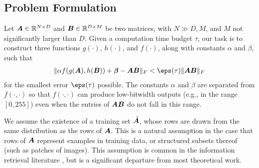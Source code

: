 \subsection{Problem Formulation} \label{sec:problemStatement}

Let $\bm{A} \in \mathbb{R}^{N \times D}$ and $\bm{B} \in \mathbb{R}^{D \times M}$ be two matrices, with $N \gg D, M$, and $M$ not significantly larger than $D$. Given a computation time budget $\tau$, our task is to
construct three functions $g(\cdot)$, $h(\cdot)$, and $f(\cdot)$, along with constants $\alpha$ and $\beta$, such that
\begin{align} \label{eq:objective}
    \norm{\alpha f(g(\A), h(\B)) + \mat{\beta} - \A\B}_F < \eps(\tau) \norm{\A\B}_F
\end{align}
for the smallest error $\eps(\tau)$ possible. The constants $\alpha$ and $\beta$ are separated from $f(\cdot,\cdot)$ so that $f(\cdot,\cdot)$ can produce low-bitwidth outputs (e.g., in the range $[0, 255]$) even when the entries of $\bm{A}\bm{B}$ do not fall in this range.

We assume the existence of a training set $\tilde{\bm{A}}$, whose rows are drawn from the same distribution as the rows of $\bm{A}$. This is a natural assumption in the case that rows of $\bm{A}$ represent examples in training data, or structured subsets thereof (such as patches of images). This assumption is common in the information retrieval literature \cite{bolt,pairq,quip}, but is a significant departure from most theoretical work.
